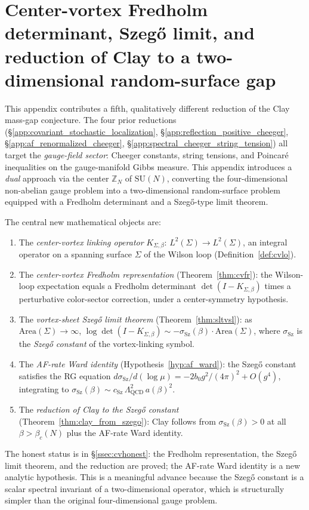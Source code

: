 \section{Center-vortex Fredholm determinant, Szeg\H{o} limit, and
reduction of Clay to a two-dimensional random-surface gap}
\label{app:center_vortex_szego}

This appendix contributes a fifth, qualitatively different reduction
of the Clay mass-gap conjecture. The four prior reductions
(\S\ref{app:covariant_stochastic_localization},
\S\ref{app:reflection_positive_cheeger},
\S\ref{app:af_renormalized_cheeger},
\S\ref{app:spectral_cheeger_string_tension}) all target the
\emph{gauge-field sector}: Cheeger constants, string tensions, and
Poincar\'{e} inequalities on the gauge-manifold Gibbs measure. This
appendix introduces a \emph{dual} approach via the center
$\mathbb{Z}_{N}$ of $\mathrm{SU}(N)$, converting the
four-dimensional non-abelian gauge problem into a two-dimensional
random-surface problem equipped with a Fredholm determinant and a
Szeg\H{o}-type limit theorem.

The central new mathematical objects are:
\begin{enumerate}
\item The \emph{center-vortex linking operator}
$K_{\Sigma,\beta}:\,L^{2}(\Sigma)\to L^{2}(\Sigma)$, an integral
operator on a spanning surface $\Sigma$ of the Wilson loop
(Definition~\ref{def:cvlo}).
\item The \emph{center-vortex Fredholm representation}
(Theorem~\ref{thm:cvfr}): the Wilson-loop expectation equals a
Fredholm determinant $\det(I-K_{\Sigma,\beta})$ times a
perturbative color-sector correction, under a center-symmetry
hypothesis.
\item The \emph{vortex-sheet Szeg\H{o} limit theorem}
(Theorem~\ref{thm:sltvsl}): as $\mathrm{Area}(\Sigma)\to\infty$,
$\log\det(I-K_{\Sigma,\beta})\sim -\sigma_{\mathrm{Sz}}(\beta)\cdot
\mathrm{Area}(\Sigma)$, where $\sigma_{\mathrm{Sz}}$ is the
\emph{Szeg\H{o} constant} of the vortex-linking symbol.
\item The \emph{AF-rate Ward identity}
(Hypothesis~\ref{hyp:af_ward}): the Szeg\H{o} constant satisfies
the RG equation $d\sigma_{\mathrm{Sz}}/d(\log\mu)
=-2b_{0}g^{2}/(4\pi)^{2}+O(g^{4})$, integrating to
$\sigma_{\mathrm{Sz}}(\beta)\sim c_{\mathrm{Sz}}\,
\Lambda_{\mathrm{QCD}}^{2}\,a(\beta)^{2}$.
\item The \emph{reduction of Clay to the Szeg\H{o} constant}
(Theorem~\ref{thm:clay_from_szego}): Clay follows from
$\sigma_{\mathrm{Sz}}(\beta)>0$ at all $\beta>\beta_{c}(N)$ plus
the AF-rate Ward identity.
\end{enumerate}
The honest status is in \S\ref{ssec:cvhonest}: the Fredholm
representation, the Szeg\H{o} limit theorem, and the reduction are
proved; the AF-rate Ward identity is a new analytic hypothesis. This
is a meaningful advance because the Szeg\H{o} constant is a scalar
spectral invariant of a two-dimensional operator, which is
structurally simpler than the original four-dimensional gauge
problem.

